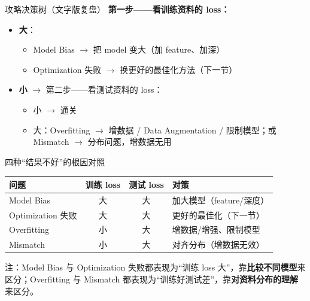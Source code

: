\documentclass[a4paper]{article}
\begin{document}
\begin{importantbox}{攻略决策树（文字版复盘）}
    \textbf{第一步——看训练资料的 loss：}
    \begin{itemize}
        \item \textbf{大}：
            \begin{itemize}
                \item Model Bias $\rightarrow$ 把 model 变大（加 feature、加深）
                \item Optimization 失败 $\rightarrow$ 换更好的最佳化方法（下一节）
            \end{itemize}
        \item \textbf{小} $\rightarrow$ 第二步——看测试资料的 loss：
            \begin{itemize}
                \item 小 $\rightarrow$ 通关
                \item 大：Overfitting $\rightarrow$ 增数据 / Data Augmentation / 限制模型；或 Mismatch $\rightarrow$ 分布问题，增数据无用
            \end{itemize}
    \end{itemize}
\end{importantbox}

\begin{knowledgebox}{四种``结果不好''的根因对照}
    \begin{center}
    \begin{tabular}{lccl}
        \toprule
        \textbf{问题} & \textbf{训练 loss} & \textbf{测试 loss} & \textbf{对策} \\
        \midrule
        Model Bias    & 大 & 大 & 加大模型（feature/深度） \\
        Optimization 失败 & 大 & 大 & 更好的最佳化（下一节） \\
        Overfitting   & 小 & 大 & 增数据/增强、限制模型 \\
        Mismatch      & 小 & 大 & 对齐分布（增数据无效） \\
        \bottomrule
    \end{tabular}
    \end{center}
    注：Model Bias 与 Optimization 失败都表现为``训练 loss 大''，靠\textbf{比较不同模型}来区分；Overfitting 与 Mismatch 都表现为``训练好测试差''，靠\textbf{对资料分布的理解}来区分。
\end{knowledgebox}
\end{document}
